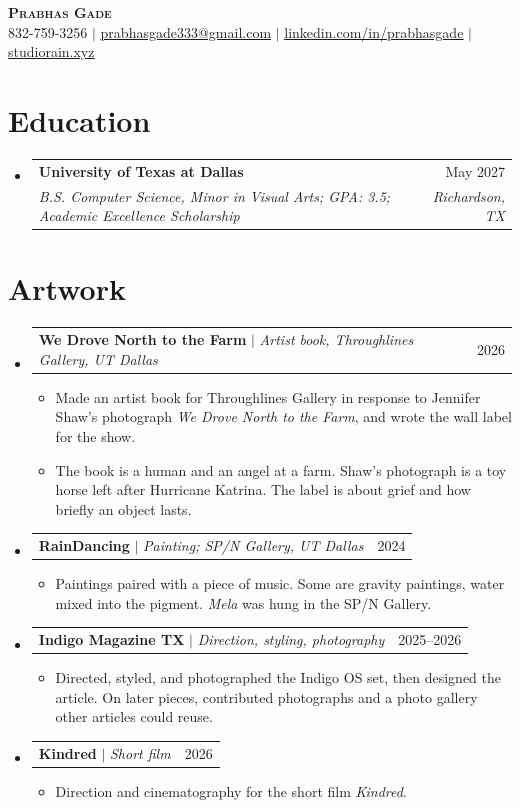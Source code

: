 \documentclass[letterpaper,11pt]{article}
\makeatletter
\newcommand{\resumeItem}[1]{
  \item\small{{#1 \vspace{-2pt}}}
}
\newcommand{\resumeSubheading}[4]{
  \vspace{-2pt}\item
    \begin{tabular*}{0.97\textwidth}[t]{l@{\extracolsep{\fill}}r}
      \textbf{#1} & #2 \\
      \textit{\small#3} & \textit{\small #4} \\
    \end{tabular*}\vspace{-7pt}
}
\newcommand{\resumeProjectHeading}[2]{
    \item
    \begin{tabular*}{0.97\textwidth}{l@{\extracolsep{\fill}}r}
      \small#1 & #2 \\
    \end{tabular*}\vspace{-7pt}
}
\newcommand{\resumeSubHeadingListStart}{\begin{itemize}[leftmargin=0.15in, label={}]}
\newcommand{\resumeSubHeadingListEnd}{\end{itemize}}
\newcommand{\resumeItemListStart}{\begin{itemize}}
\newcommand{\resumeItemListEnd}{\end{itemize}\vspace{-5pt}}
\makeatother
\begin{document}
\begin{center}
    \textbf{\Huge \scshape Prabhas Gade} \\ \vspace{1pt}
    \small 832-759-3256 $|$ \href{mailto:prabhasgade333@gmail.com}{\underline{prabhasgade333@gmail.com}} $|$
    \href{https://linkedin.com/in/prabhasgade}{\underline{linkedin.com/in/prabhasgade}} $|$
    \href{https://studiorain.xyz}{\underline{studiorain.xyz}}
\end{center}

\section{Education}
\resumeSubHeadingListStart
  \resumeSubheading
    {University of Texas at Dallas}{May 2027}
    {B.S. Computer Science, Minor in Visual Arts; GPA: 3.5; Academic Excellence Scholarship}{Richardson, TX}
\resumeSubHeadingListEnd

\section{Artwork}
\resumeSubHeadingListStart
  \resumeProjectHeading
    {\textbf{We Drove North to the Farm} $|$ \emph{Artist book, Throughlines Gallery, UT Dallas}}{2026}
  \resumeItemListStart
    \resumeItem{Made an artist book for Throughlines Gallery in response to Jennifer Shaw's photograph \textit{We Drove North to the Farm}, and wrote the wall label for the show.}
    \resumeItem{The book is a human and an angel at a farm. Shaw's photograph is a toy horse left after Hurricane Katrina. The label is about grief and how briefly an object lasts.}
  \resumeItemListEnd

  \resumeProjectHeading
    {\textbf{RainDancing} $|$ \emph{Painting; SP/N Gallery, UT Dallas}}{2024}
  \resumeItemListStart
    \resumeItem{Paintings paired with a piece of music. Some are gravity paintings, water mixed into the pigment. \textit{Mela} was hung in the SP/N Gallery.}
  \resumeItemListEnd

  \resumeProjectHeading
    {\textbf{Indigo Magazine TX} $|$ \emph{Direction, styling, photography}}{2025--2026}
  \resumeItemListStart
    \resumeItem{Directed, styled, and photographed the Indigo OS set, then designed the article. On later pieces, contributed photographs and a photo gallery other articles could reuse.}
  \resumeItemListEnd

  \resumeProjectHeading
    {\textbf{Kindred} $|$ \emph{Short film}}{2026}
  \resumeItemListStart
    \resumeItem{Direction and cinematography for the short film \textit{Kindred}.}
  \resumeItemListEnd
\resumeSubHeadingListEnd
\end{document}
